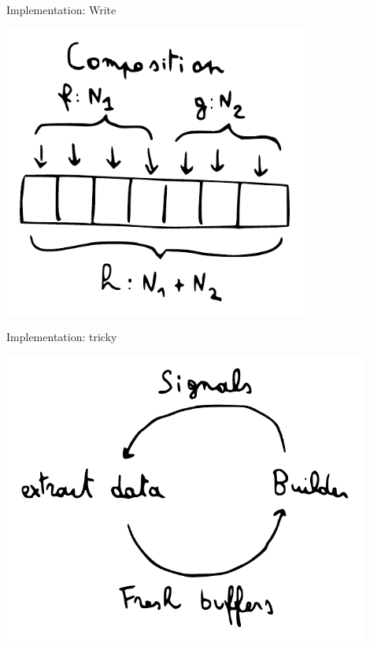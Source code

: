 \documentclass[20pt]{beamer}
\begin{document}
\begin{frame}{Implementation: Write}
    \begin{center}
    \includegraphics[width=0.75\textwidth]{images/composition.pdf}
    \end{center}
\end{frame}

\begin{frame}{Implementation: tricky}
    \begin{center}
    \includegraphics[width=0.9\textwidth]{images/builder.pdf}
    \end{center}
\end{frame}
\end{document}
